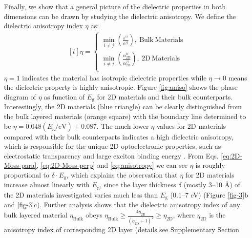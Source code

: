 \documentclass[journal=ancac3,manuscript=article,email=true,hyperref=true,keywords=false]{achemso}
\begin{document}
Finally, we show that a general picture of the dielectric properties in
both dimensions can be drawn by studying the dielectric
anisotropy. We define the dielectric anisotropy index $\eta$ as:
\begin{equation}
  \label{eq:anisotropy}
  \begin{aligned}[t]
    \eta =
    \begin{cases}
      {\displaystyle \min_{i \neq j}}
      {\displaystyle
        \left(\frac{\varepsilon^{ii}}{\varepsilon^{jj}}\right)},
      \ \mathrm{Bulk\ Materials}\\
      {\displaystyle \min_{i \neq j}}
      {\displaystyle
        \left(\frac{\alpha_{\mathrm{2D}}^{ii}}{\alpha_{\mathrm{2D}}^{jj}}\right)},
      \ \mathrm{2D\ Materials}\\
    \end{cases}
  \end{aligned}
\end{equation}
$\eta=1$ indicates the material has isotropic dielectric properties
while $\eta \to 0$ means the dielectric property is highly
anisotropic. Figure \ref{fig:aniso} shows the phase diagram of $\eta$
as function of $E_{\mathrm{g}}$ for 2D materials and their bulk
counterparts. Interestingly, the 2D materials (blue triangle) can be
clearly distinguished from the bulk layered materials (orange square)
with the boundary line determined to be
$\eta =0.048 (E_{\mathrm{g}}/ \mathrm{eV})+0.087$. The much lower
$\eta$ values for 2D materials compared with their bulk counterparts
indicates a high dielectric anisotropy, which is responsible for the
unique 2D optoelectronic properties, such as electrostatic
transparency \cite{Liluhua_2014,Tian_2016,Li_2018} and large exciton
binding energy
\cite{Pulci_2014,Tran_2014,Chernikov_2014_EB_MoS2_2D3D,Berkelbach_2013}. From
Eqs. \ref{eq:2D-Moss-para}, \ref{eq:2D-Moss-perp} and
\ref{eq:anisotropy} we can see $\eta$ is roughly proportional to
$\delta \cdot E_{\mathrm{g}}$, which explains the observation that
$\eta$ for 2D materials increase almost linearly with
$E_{\mathrm{g}}$, since the layer thickness $\delta$ (mostly 3--10
\AA{}) of the 2D materials investigated varies much less than
$E_{\mathrm{g}}$ (0.1--7 eV) (Figure \ref{fig-3}b and
\ref{fig-3}c). Further analysis shows that the dielectric anisotropy
index of any bulk layered material $\eta_{\mathrm{Bulk}}$ obeys
$\eta_{\mathrm{Bulk}} \geq {\displaystyle \frac{4
    \eta_{\mathrm{2D}}}{(\eta_{\mathrm{2D}}+1)^{2}}} \geq
\eta_{\mathrm{2D}}$, where $\eta_{\mathrm{2D}}$ is the anisotropy
index of corresponding 2D layer (details see Supplementary Section
\end{document}
